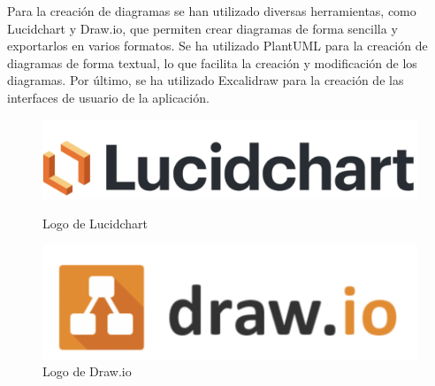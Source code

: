 Para la creación de diagramas se han utilizado diversas herramientas, como Lucidchart y Draw.io, que permiten crear diagramas de forma sencilla y exportarlos en varios formatos.
Se ha utilizado PlantUML para la creación de diagramas de forma textual, lo que facilita la creación y modificación de los diagramas. 
Por último, se ha utilizado Excalidraw para la creación de las interfaces de usuario de la aplicación.

\begin{figure}[H]
    \centering
    \begin{minipage}{0.2\textwidth}
        \centering
        \includegraphics[width=\textwidth]{figures/7-Construccion/Lucidchart.png}
        \caption{Logo de Lucidchart}
    \end{minipage}
    \hspace{0.05\textwidth}
    \begin{minipage}{0.2\textwidth}
        \centering
        \includegraphics[width=\textwidth]{figures/7-Construccion/Drawio.png}
        \caption{Logo de Draw.io}
    \end{minipage}
\end{figure}

